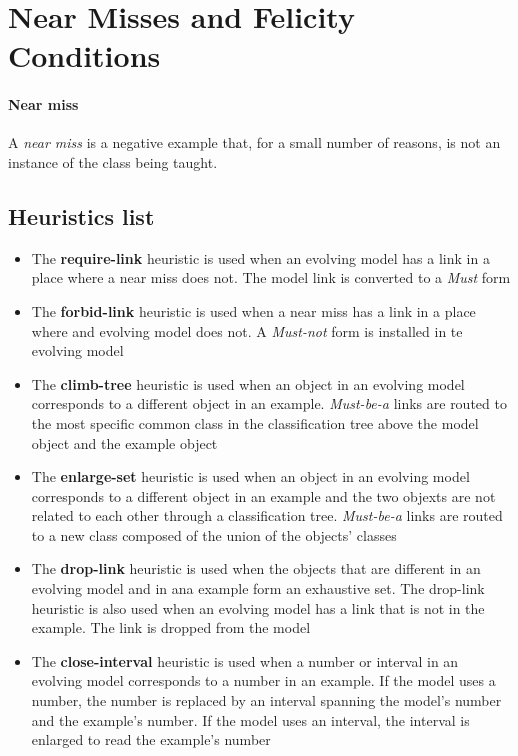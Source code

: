 \section{Near Misses and Felicity Conditions}


\paragraph{Near miss} A \textit{near miss} is a negative example
that, for a small number of reasons, is not an instance of the
class being taught.

\subsection{Heuristics list}
\begin{itemize}
  \item The \textbf{require-link} heuristic is used when an
    evolving model has a link in a place where a near miss does
    not. The model link is converted to a \textit{Must} form
  \item The \textbf{forbid-link} heuristic is used when a near miss
    has a link in a place where and evolving model does not. A
    \textit{Must-not} form is installed in te evolving model
  \item The \textbf{climb-tree} heuristic is used when an object in
    an evolving model corresponds to a different object in an
    example. \textit{Must-be-a} links are routed to the most
    specific common class in the classification tree above the
    model object and the example object
  \item The \textbf{enlarge-set} heuristic is used when an object
    in an evolving model corresponds to a different object in an
    example and the two objexts are not related to each other
    through a classification tree. \textit{Must-be-a} links are
    routed to a new class composed of the union of the objects'
    classes
  \item The \textbf{drop-link} heuristic is used when the objects
    that are different in an evolving model and in ana example form
    an exhaustive set. The drop-link heuristic is also used when
    an evolving model has a link that is not in the example. The
    link is dropped from the model
  \item The \textbf{close-interval} heuristic is used when a number
    or interval in an evolving model corresponds to a number in an
    example. If the model uses a number, the number is replaced by
    an interval spanning the model's number and the example's
    number. If the model uses an interval, the interval is enlarged
    to read the example's number
\end{itemize}

